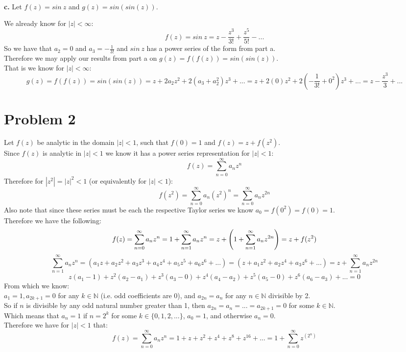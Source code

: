 \documentclass{article}
\begin{document}
\newpage
{\Large\textbf{c.}} Let $f(z) = sin\:z$ and $g(z) = sin(sin(z))$.
\begin{center}
    \doublespacing
    We already know for $|z| <\infty$:
    \[f(z) = sin\:z = z -\frac{z^3}{3!} +\frac{z^5}{5!} - ...\]
    So we have that $a_2 = 0$ and $a_3 = -\frac{1}{3!}$ and $sin\:z$ has a power series of the form from part a.
    \\Therefore we may apply our results from part a on $g(z) = f(f(z)) = sin(sin(z))$.
    \\That is we know for $|z| <\infty$:
    \[g(z) = f(f(z)) = sin(sin(z)) = z + 2a_2 z^2 + 2(a_3 + a_2^2) z^3 + ... = z + 2(0) z^2 + 2(-\frac{1}{3!} + 0^2) z^3 + ... = z -\frac{z^3}{3} + ...\]
    \qedsymbol
\end{center}


\newpage
\section*{Problem 2}
\begin{center}
    \doublespacing
    Let $f(z)$ be analytic in the domain $|z| < 1$, such that $f(0) = 1$ and $f(z) = z + f(z^2)$.
    \\Since $f(z)$ is analytic in $|z| < 1$ we know it has a power series representation for $|z| < 1$:
    \[f(z) =\sum _{n=0}^{\infty} a_n z^n\]
    Therefore for $|z^2| = |z|^2 < 1$ (or equivalently for $|z| < 1$):
    \[f(z^2) =\sum _{n=0}^{\infty} a_n (z^2)^n =\sum _{n=0}^{\infty} a_n z^{2n}\]
    Also note that since these series must be each the respective Taylor series we know $a_0 = f(0^2) = f(0) = 1$.
    \\Therefore we have the following:
    \[f(z) =\sum _{n=0}^{\infty} a_n z^n = 1 +\sum _{n=1}^{\infty} a_n z^n = z +\Bigg{(}1 +\sum _{n=1}^{\infty} a_n z^{2n}\Bigg{)} = z + f(z^2)\]
    \[\sum _{n=1}^{\infty} a_n z^n = (a_1 z + a_2 z^2 + a_3 z^3 + a_4 z^4 + a_5 z^5 + a_6 z^6 + ...) = (z + a_1 z^2 + a_2 z^4 + a_3 z^6 + ...) = z +\sum _{n=1}^{\infty} a_n z^{2n}\]
    \[z (a_1 - 1) + z^2 (a_2 - a_1) + z^3 (a_3 - 0) + z^4 (a_4 - a_2) + z^5 (a_5 - 0) + z^6 (a_6 - a_3) + ... = 0\]
    From which we know:
    \\$a_1 = 1, a_{2k + 1} = 0$ for any $k\in\mathbb{N}$ (i.e. odd coefficients are 0), and $a_{2n} = a_n$ for any $n\in\mathbb{N}$ divisible by 2.
    \\So if $n$ is divisible by any odd natural number greater than 1, then $a_{2n} = a_n = ... = a_{2k+1} = 0$ for some $k\in\mathbb{N}$.
    \\Which means that $a_n = 1$ if $n = 2^k$ for some $k\in\{0, 1, 2, ...\}$, $a_0 = 1$, and otherwise $a_n = 0$.
    \\Therefore we have for $|z| < 1$ that:
    \[f(z) =\sum _{n=0}^{\infty} a_n z^n = 1 + z + z^2 + z^4 + z^8 + z^{16} + ... = 1 +\sum _{n=0}^{\infty} z^{(2^n)}\]
    \qedsymbol
\end{center}
\end{document}
